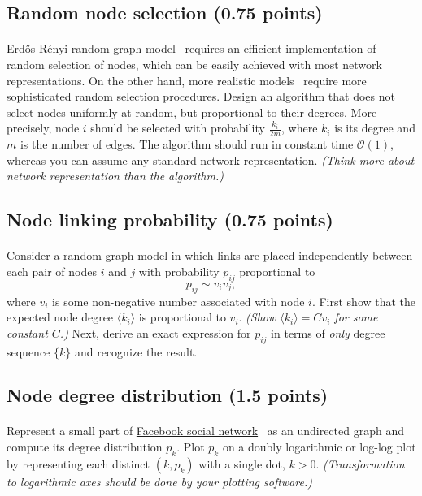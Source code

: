 \documentclass[11pt,a4paper]{article}
\newcommand{\cmp}[1]{\mathcal{O}(#1)}
\newcommand{\avg}[1]{\langle#1\rangle}
\newcommand{\hint}[1]{{\it (#1)}}
\newcommand{\totals}[1]{({\color{magenta}#1 points})}
\begin{document}
\subsection{Random node selection \totals{0.75}}

\paragraph{} Erd\H{o}s-R\'{e}nyi random graph model~\cite{ER59} requires an efficient implementation of random selection of nodes, which can be easily achieved with most network representations. On the other hand, more realistic models~\cite{BA99} require more sophisticated random selection procedures. Design an algorithm that does not select nodes uniformly at random, but proportional to their degrees. More precisely, node $i$ should be selected with probability $\frac{k_i}{2m}$, where $k_i$ is its degree and $m$ is the number of edges. The algorithm should run in constant time $\cmp{1}$, whereas you can assume any standard network representation. \hint{Think more about network representation than the algorithm.}

\subsection{Node linking probability \totals{0.75}}

\paragraph{} Consider a random graph model in which links are placed independently between each pair of nodes $i$ and $j$ with probability $p_{ij}$ proportional to
$$p_{ij}\sim v_iv_j,$$
where $v_i$ is some non-negative number associated with node $i$. First show that the expected node degree $\avg{k_i}$ is proportional to $v_i$. \hint{Show $\avg{k_i}=Cv_i$ for some constant $C$.} Next, derive an exact expression for $p_{ij}$ in terms of {\it only} degree sequence $\{k\}$ and recognize the result.

\subsection{Node degree distribution \totals{1.5}}

\paragraph{} Represent a small part of \href{http://lovro.lpt.fri.uni-lj.si/ina/nets/facebook}{Facebook social network}~\cite{VMCG09} as an undirected graph and compute its degree distribution $p_k$. Plot $p_k$ on a doubly logarithmic or log-log plot by representing each distinct $(k,p_k)$ with a single dot, $k>0$. \hint{Transformation to logarithmic axes should be done by your plotting software.} 
\end{document}
